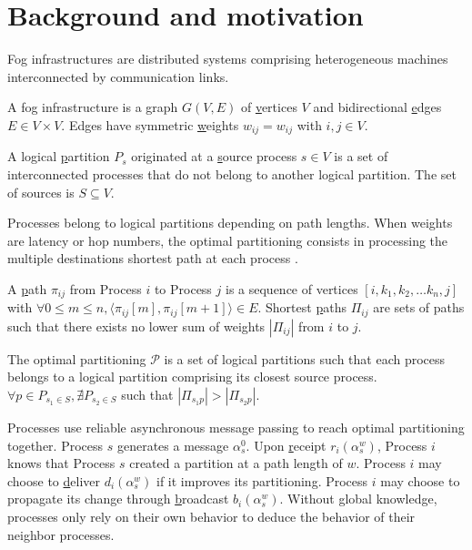 
\section{Background and motivation}
\label{sec:background}

Fog infrastructures are distributed systems comprising heterogeneous
machines interconnected by communication links. 

\begin{definition}
  A fog infrastructure is a \underline{g}raph $G(V, E)$ of
  \underline{v}ertices $V$ and bidirectional \underline{e}dges $E \in
  V \times V$. Edges have symmetric \underline{w}eights $w_{ij} =
  w_{ij}$ with $i, j \in V$.
\end{definition}

\begin{definition}
  A logical \underline{p}artition $P_s$ originated at a
  \underline{s}ource process $s \in V$ is a set of interconnected
  processes that do not belong to another logical partition. The set
  of sources is $S \subseteq V$.
\end{definition}

Processes belong to logical partitions depending on path lengths. When
weights are latency or hop numbers, the optimal partitioning consists
in processing the multiple destinations shortest path at each process
\REF.

\begin{definition}
  A \underline{p}ath $\pi_{ij}$ from Process $i$ to Process $j$ is a
  sequence of vertices $[i, k_1, k_2, \ldots k_n, j]$ with $\forall
  0\leq m \leq n, \langle \pi_{ij}[m], \pi_{ij}[m+1] \rangle \in
  E$. Shortest \underline{p}aths $\Pi_{ij}$ are sets of paths such
  that there exists no lower sum of weights $|\Pi_{ij}|$ from $i$ to
  $j$.
\end{definition}

\begin{definition}
  The optimal partitioning $\mathcal{P}$ is a set of logical
  partitions such that each process belongs to a logical partition
  comprising its closest source process.  $\forall p \in P_{s_1\in S},
  \nexists P_{s_2 \in S}$ such that $|\Pi_{s_1p}| > |\Pi_{s_2p}|$.
\end{definition}

Processes use reliable asynchronous message passing to reach optimal
partitioning together. Process $s$ generates a message
$\alpha_s^0$. Upon \underline{r}eceipt $r_i(\alpha_s^{w})$, Process
$i$ knows that Process $s$ created a partition at a path length of
$w$. Process $i$ may choose to \underline{d}eliver $d_i(\alpha_s^{w})$
if it improves its partitioning. Process $i$ may choose to propagate
its change through \underline{b}roadcast $b_i(\alpha_s^w)$.  Without
global knowledge, processes only rely on their own behavior to deduce
the behavior of their neighbor processes.

